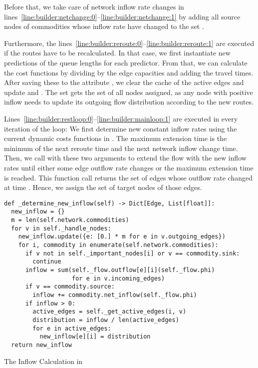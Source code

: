 Before that, we take care of network inflow rate changes in lines~\ref{line:builder:netchange:0}--\ref{line:builder:netchange:1} by adding all source nodes of commodities whose inflow rate have changed to the set .

Furthermore, the lines~\ref{line:builder:reroute:0}--\ref{line:builder:reroute:1} are executed if the routes have to be recalculated.
In that case, we first instantiate new predictions of the queue lengths for each predictor.
From that, we can calculate the cost functions by dividing by the edge capacities and adding the travel times.
After saving these to the attribute , we clear the cache of the active edges and update  and .
The set  gets the set of all nodes assigned, as any node with positive inflow needs to update its outgoing flow distribution according to the new routes.

Lines~\ref{line:builder:restloop:0}--\ref{line:builder:mainloop:1} are executed in every iteration of the loop:
We first determine new constant inflow rates using the current dynamic costs functions in .
The maximum extension time is the minimum of the next reroute time and the next network inflow change time.
Then, we call  with these two arguments to extend the flow with the new inflow rates until either some edge outflow rate changes or the maximum extension time is reached.
This function call returns the set of edges whose outflow rate changed at time .
Hence, we assign  the set of target nodes of those edges. 



\begin{algorithm}
  \begin{verbatim}
def _determine_new_inflow(self) -> Dict[Edge, List[float]]:
  new_inflow = {}
  m = len(self.network.commodities)
  for v in self._handle_nodes:
    new_inflow.update({e: [0.] * m for e in v.outgoing_edges})
    for i, commodity in enumerate(self.network.commodities):
      if v not in self._important_nodes[i] or v == commodity.sink:
        continue
      inflow = sum(self._flow.outflow[e][i](self._flow.phi)
                   for e in v.incoming_edges)
      if v == commodity.source:
        inflow += commodity.net_inflow(self._flow.phi)
      if inflow > 0:
        active_edges = self._get_active_edges(i, v)
        distribution = inflow / len(active_edges)
        for e in active_edges:
          new_inflow[e][i] = distribution
  return new_inflow
\end{verbatim}
\caption{The Inflow Calculation in }
\label{alg:determine-new-inflow}
\end{algorithm}
